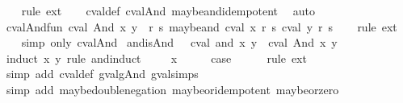 \begin{isabellebody}
%
\isadelimproof
\ \ %
\endisadelimproof
%
\isatagproof
{}\isamarkupfalse%
\ {\isacharparenleft}rule\ ext{\isacharparenright}{\isacharplus}\isanewline
\ \ \isamarkupfalse%
\ cval{\isacharunderscore}def\ cval{\isacharunderscore}And\ maybe{\isacharunderscore}and{\isacharunderscore}idempotent\ \isamarkupfalse%
\ auto%
\endisatagproof
{\isafoldproof}%
%
\isadelimproof
\isanewline
%
\endisadelimproof
\isanewline
{}\isamarkupfalse%
\ cval{\isacharunderscore}And{\isacharunderscore}fun{\isacharcolon}\ {\isachardoublequoteopen}cval\ {\isacharparenleft}And\ x\ y{\isacharparenright}\ {\isacharequal}\ {\isacharparenleft}{\isasymlambda}r\ s{\isachardot}\ maybe{\isacharunderscore}and\ {\isacharparenleft}cval\ x\ r\ s{\isacharparenright}\ {\isacharparenleft}cval\ y\ r\ s{\isacharparenright}{\isacharparenright}{\isachardoublequoteclose}\isanewline
%
\isadelimproof
\ \ %
\endisadelimproof
%
\isatagproof
{}\isamarkupfalse%
\ {\isacharparenleft}rule\ ext{\isacharparenright}{\isacharplus}\isanewline
\ \ \isamarkupfalse%
\ {\isacharparenleft}simp\ only{\isacharcolon}\ cval{\isacharunderscore}And{\isacharparenright}%
\endisatagproof
{\isafoldproof}%
%
\isadelimproof
\isanewline
%
\endisadelimproof
\isanewline
{}\isamarkupfalse%
\ and{\isacharunderscore}is{\isacharunderscore}And\ {\isacharcolon}\ \ {\isachardoublequoteopen}cval\ {\isacharparenleft}and\ x\ y{\isacharparenright}\ {\isacharequal}\ cval\ {\isacharparenleft}And\ x\ y{\isacharparenright}{\isachardoublequoteclose}\isanewline
%
\isadelimproof
%
\endisadelimproof
%
\isatagproof
{}\isamarkupfalse%
\ {\isacharparenleft}induct\ x\ y\ rule{\isacharcolon}\ and{\isachardot}induct{\isacharparenright}\isanewline
\ \ \isamarkupfalse%
\ {\isacharparenleft}{}\ x{\isacharparenright}\isanewline
\ \ \isamarkupfalse%
\ \isamarkupfalse%
\ {\isacharquery}case\isanewline
\ \ \ \ \isamarkupfalse%
\ {\isacharparenleft}rule\ ext{\isacharparenright}{\isacharplus}\isanewline
\ \ \ \ \isamarkupfalse%
\ {\isacharparenleft}simp\ add{\isacharcolon}\ cval{\isacharunderscore}def\ gval{\isacharunderscore}gAnd\ gval{\isachardot}simps{\isacharparenright}\isanewline
\ \ \ \ \isamarkupfalse%
\ {\isacharparenleft}simp\ add{\isacharcolon}\ maybe{\isacharunderscore}double{\isacharunderscore}negation\ maybe{\isacharunderscore}or{\isacharunderscore}idempotent\ maybe{\isacharunderscore}or{\isacharunderscore}zero{\isacharparenright}\isanewline

\end{isabellebody}
